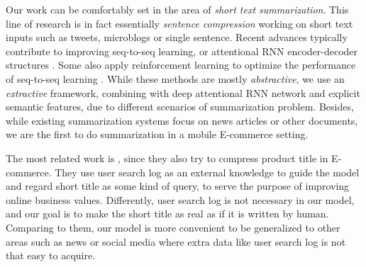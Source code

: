 Our work can be comfortably set in the area 
of \textit{short text summarization}.
This line of research is in fact essentially \textit{sentence compression}
working on short text inputs such as tweets, microblogs or single sentence. 
Recent advances typically contribute to improving seq-to-seq learning, 
or attentional RNN encoder-decoder structures \cite{chopra2016abstractive,nallapati2016abstractive,wang2018multi}.
Some also apply reinforcement learning to optimize the performance of seq-to-seq learning \cite{zhang2017sentence}.
While these methods are mostly \emph{abstractive}, 
we use an \emph{extractive} framework,
combining with deep attentional RNN network and explicit semantic features, due to different scenarios of summarization problem.
Besides, while existing summarization systems focus on 
news articles or other documents, 
we are the first to do summarization in a mobile E-commerce setting.
 
The most related work is ,
since they also try to compress product title in E-commerce. 
They use user search log as an external knowledge to guide the model and regard short title as some kind of query, 
to serve the purpose of improving online business values.
Differently, 
user search log is not necessary in our model,
and our goal is to make the short title as real as if it is written by human.
Comparing to them, 
our model is more convenient to be generalized to 
other areas
such as news or social media where extra data like user search log is not that easy to acquire.

